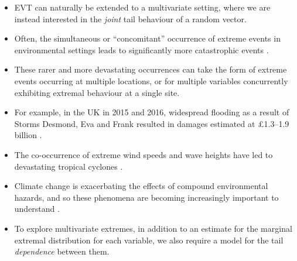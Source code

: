 \documentclass{article}
\numberwithin{equation}{section}
\begin{document}
\begin{itemize}
  \item EVT can naturally be extended to a multivariate setting, where we are instead interested in the \emph{joint} tail behaviour of a random vector. 
  \item Often, the simultaneous or ``concomitant'' occurrence of extreme events in environmental settings leads to significantly more catastrophic events \citep{zscheischler2018future, bevacqua2021guidelines}.
  \item These rarer and more devastating occurrences can take the form of extreme events occurring at multiple locations, or for multiple variables concurrently exhibiting extremal behaviour at a single site.
  \item For example, in the UK in 2015 and 2016, widespread flooding as a result of Storms Desmond, Eva and Frank resulted in damages estimated at £1.3–1.9 billion \citep{FloodsWinter, Rohrbeck2021}.
  \item The co-occurrence of extreme wind speeds and wave heights have led to devastating tropical cyclones \citep{Sando2022}.
  \item Climate change is exacerbating the effects of compound environmental hazards, and so these phenomena are becoming increasingly important to understand \citet{AghaKouchak2020-ji}.
  \item To explore multivariate extremes, in addition to an estimate for the marginal extremal distribution for each variable, we also require a model for the tail \emph{dependence} between them.
\end{itemize}

\vspace{1cm}
\end{document}
